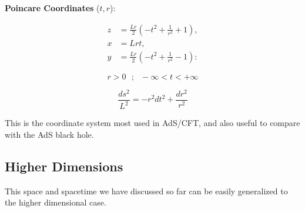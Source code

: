 \documentclass[12pt]{article}
\begin{document}
\textbf{Poincare Coordinates} (\( t,r \)):

\begin{equation}
    \begin{aligned}
        z &= \frac{Lr}{2}\left(-t^2 + \frac{1}{r^2} + 1 \right), \\
        x &= Lrt, \\
        y &= \frac{Lr}{2}\left(-t^2 + \frac{1}{r^2} - 1 \right):
    \end{aligned}
\end{equation}

\[ r > 0 ~~~ ; ~~~ -\infty < t < +\infty \]

\begin{equation}
    \frac{ds^2}{L^2} = -r^2 dt^2 + \frac{dr^2}{r^2}
\end{equation}

This is the coordinate system most used in AdS/CFT, and also useful to compare with the AdS black hole.

\subsection{Higher Dimensions}

This space and spacetime we have discussed so far can be easily generalized to the higher dimensional case.
\end{document}
